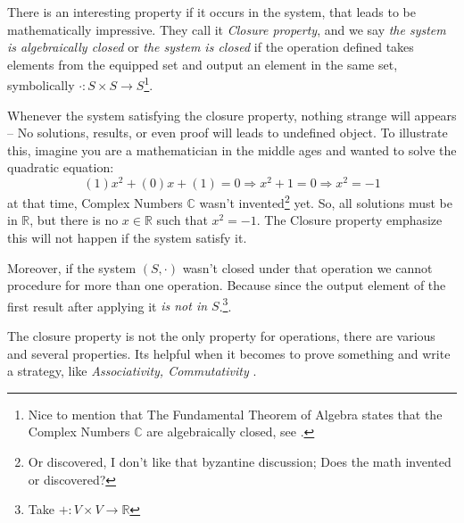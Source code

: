 There is an interesting property if it occurs in the system, that leads to be mathematically impressive. They call it {\it Closure property}, and we say {\it the system is algebraically closed} or {\it the system is closed} if the operation defined takes elements from the equipped set and output an element in the same set, symbolically $\cdot: S\times S\longrightarrow S$\footnote{Nice to mention that The Fundamental Theorem of Algebra states that the Complex Numbers $\mathbb{C}$ are algebraically closed, see \cite{enwiki:1023272575}.}.

Whenever the system satisfying the closure property, nothing strange will appears -- No solutions, results, or even proof will leads to undefined object. To illustrate this, imagine you are a mathematician in the middle ages and wanted to solve the quadratic equation: $$(1)x^2+(0)x+(1)=0 \Longrightarrow x^{2}+1=0 \Longrightarrow x^{2}=-1$$ 
at that time, Complex Numbers $\mathbb{C}$ wasn't invented\footnote{Or discovered, I don't like that byzantine discussion; Does the math invented or discovered?} yet. So, all solutions must be in $\mathbb{R}$, but there is no $x \in \mathbb{R}$ such that $x^{2}=-1$. The Closure property emphasize this will not happen if the system satisfy it.

Moreover, if the system $(S,\cdot)$ wasn't closed under that operation we cannot procedure for more than one operation. Because since the output element of the first result after applying it  {\it is not in $S$}.\footnote{Take $+:V\times V\longrightarrow \mathbb{R}$}. 

The closure property is not the only property for operations, there are various and several properties. Its helpful when it becomes to prove something and write a strategy, like {\it Associativity, Commutativity }.